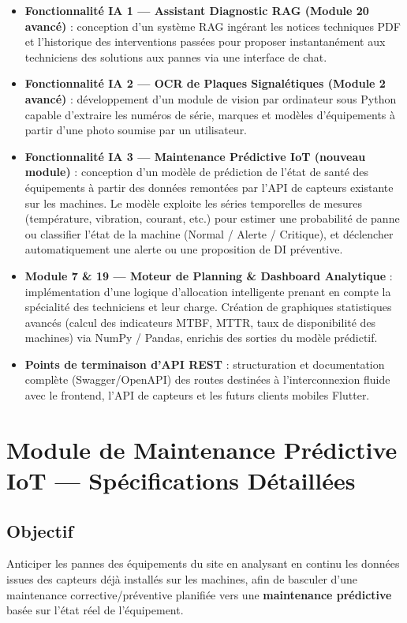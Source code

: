 \documentclass[11pt,a4paper]{article}
\begin{document}
\begin{itemize}
  \item \textbf{Fonctionnalité IA 1 — Assistant Diagnostic RAG (Module 20 avancé)} : conception d'un système RAG ingérant les notices techniques PDF et l'historique des interventions passées pour proposer instantanément aux techniciens des solutions aux pannes via une interface de chat.
  \item \textbf{Fonctionnalité IA 2 — OCR de Plaques Signalétiques (Module 2 avancé)} : développement d'un module de vision par ordinateur sous Python capable d'extraire les numéros de série, marques et modèles d'équipements à partir d'une photo soumise par un utilisateur.
  \item \textbf{Fonctionnalité IA 3 — Maintenance Prédictive IoT (nouveau module)} : conception d'un modèle de prédiction de l'état de santé des équipements à partir des données remontées par l'API de capteurs existante sur les machines. Le modèle exploite les séries temporelles de mesures (température, vibration, courant, etc.) pour estimer une probabilité de panne ou classifier l'état de la machine (Normal / Alerte / Critique), et déclencher automatiquement une alerte ou une proposition de DI préventive.
  \item \textbf{Module 7 \& 19 — Moteur de Planning \& Dashboard Analytique} : implémentation d'une logique d'allocation intelligente prenant en compte la spécialité des techniciens et leur charge. Création de graphiques statistiques avancés (calcul des indicateurs MTBF, MTTR, taux de disponibilité des machines) via NumPy / Pandas, enrichis des sorties du modèle prédictif.
  \item \textbf{Points de terminaison d'API REST} : structuration et documentation complète (Swagger/OpenAPI) des routes destinées à l'interconnexion fluide avec le frontend, l'API de capteurs et les futurs clients mobiles Flutter.
\end{itemize}

\section{Module de Maintenance Prédictive IoT — Spécifications Détaillées}

\subsection{Objectif}
Anticiper les pannes des équipements du site en analysant en continu les données issues des capteurs déjà installés sur les machines, afin de basculer d'une maintenance corrective/préventive planifiée vers une \textbf{maintenance prédictive} basée sur l'état réel de l'équipement.
\end{document}

